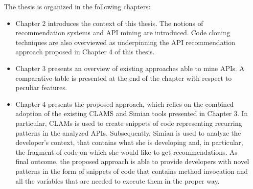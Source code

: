 The thesis is organized in the following chapters:

\begin{itemize}
	\item Chapter 2 introduces the context of this thesis. 
	The notions of 
	recommendation systems and API mining are introduced. 
	Code cloning 
	techniques are also overviewed as underpinning the API 
	recommendation 
	approach proposed in Chapter 4 of this thesis.
		
	
	\item Chapter 3 presents an overview of existing 
	approaches able to mine 
	APIs. A comparative table is presented at the end of the 
	chapter with 
	respect to peculiar features.
	
	
	\item Chapter 4 presents the proposed approach, which 
	relies on the combined
	adoption of the existing CLAMS and Simian tools presented 
	in Chapter 3. In 
	particular, CLAMs is used to create snippets of code 
	representing recurring 
	patterns in the analyzed APIs. Subsequently, Simian is 
	used to analyze the 
	developer's context, that contains what she is developing 
	and, in 
	particular, the fragment of code on which she would like 
	to get 
	recommendations. As final outcome, the proposed approach 
	is able to provide 
	developers with novel patterns in the form of snippets of 
	code that 
	contains method invocation and all the variables that are 
	needed to execute 
	them in the proper way.
	

\end{itemize}
